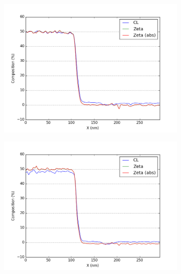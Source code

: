 \begin{figure}
	\begin{subfigure}{.5\textwidth}
		\centering
		\includegraphics[width=\linewidth]{fig/q/1_ga_nm}
		\caption{}
		\label{fig:zeta_area1_ga}
	\end{subfigure}%
	\begin{subfigure}{.5\textwidth}
		\centering
		\includegraphics[width=\linewidth]{fig/q/1_as_nm}
		\caption{}
		\label{fig:zeta_area1_as}
	\end{subfigure}
		\begin{subfigure}{.5\textwidth}
			\centering

\end{subfigure}
\end{figure}
